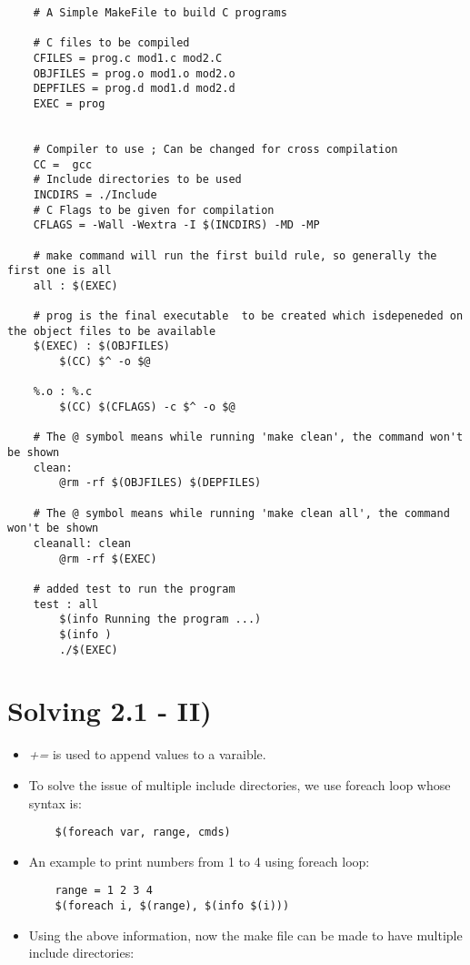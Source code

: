 \documentclass{article}
\begin{document}
\begin{verbatim}
    # A Simple MakeFile to build C programs

    # C files to be compiled
    CFILES = prog.c mod1.c mod2.C
    OBJFILES = prog.o mod1.o mod2.o
    DEPFILES = prog.d mod1.d mod2.d
    EXEC = prog


    # Compiler to use ; Can be changed for cross compilation
    CC =  gcc
    # Include directories to be used
    INCDIRS = ./Include
    # C Flags to be given for compilation
    CFLAGS = -Wall -Wextra -I $(INCDIRS) -MD -MP

    # make command will run the first build rule, so generally the first one is all
    all : $(EXEC)

    # prog is the final executable  to be created which isdepeneded on the object files to be available
    $(EXEC) : $(OBJFILES)
        $(CC) $^ -o $@

    %.o : %.c
        $(CC) $(CFLAGS) -c $^ -o $@

    # The @ symbol means while running 'make clean', the command won't be shown 
    clean:
        @rm -rf $(OBJFILES) $(DEPFILES)

    # The @ symbol means while running 'make clean all', the command won't be shown 
    cleanall: clean
        @rm -rf $(EXEC)

    # added test to run the program
    test : all
        $(info Running the program ...)
        $(info )
        ./$(EXEC)

\end{verbatim}
\section{Solving 2.1 - II)}
\begin{itemize}
    \item \emph{+=} is used to append values to a varaible.
    \item To solve the issue of multiple include directories, we use foreach loop whose syntax is:
          \begin{verbatim}
    $(foreach var, range, cmds)
    \end{verbatim}
    \item An example to print numbers from 1 to 4 using foreach loop:
          \begin{verbatim}
    range = 1 2 3 4
    $(foreach i, $(range), $(info $(i)))
    \end{verbatim}
    \item Using the above information, now the make file can be made to have multiple include directories:
\end{itemize}
\end{document}
